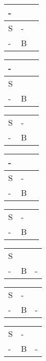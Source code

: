 \documentclass{article}
\newcommand{\wombat}{\cellcolor{newred}}
\newcommand{\pit}{\cellcolor{newblue}}
\newcommand{\wompit}{\cellcolor{newpurple}}
\begin{document}
	\begin{center}
		\begin{tabular}{|m{0.25cm}|m{0.25cm}|m{0.25cm}|}
			\hline
			- &&  \\ \hline
			S & - &\\ \hline
			- & B & \wompit \\ \hline
		\end{tabular}
		\quad
		\begin{tabular}{|m{0.25cm}|m{0.25cm}|m{0.25cm}|}
			\hline
			- &&  \\ \hline
			S & \wombat & \\ \hline
			- & B & \pit \\ \hline
		\end{tabular}
		\quad
		\begin{tabular}{|m{0.25cm}|m{0.25cm}|m{0.25cm}|}
			\hline
			\wombat &&  \\ \hline
			S & - & \\ \hline
			- & B & \pit \\ \hline
		\end{tabular}
		\quad
		\begin{tabular}{|m{0.25cm}|m{0.25cm}|m{0.25cm}|}
			\hline
			- &&  \\ \hline
			S & - & \\ \hline
			- & B & \pit \\ \hline
		\end{tabular}
	\end{center}

	\begin{center}
		\begin{tabular}{|m{0.25cm}|m{0.25cm}|m{0.25cm}|}
			\hline
			\pit &&  \\ \hline
			S & - &\\ \hline
			- & B & \wombat \\ \hline
		\end{tabular}
		\quad
		\begin{tabular}{|m{0.25cm}|m{0.25cm}|m{0.25cm}|}
			\hline
			\pit &&  \\ \hline
			S & \wombat & \\ \hline
			- & B & - \\ \hline
		\end{tabular}
		\quad
		\begin{tabular}{|m{0.25cm}|m{0.25cm}|m{0.25cm}|}
			\hline
			\wompit &&  \\ \hline
			S & - & \\ \hline
			- & B & - \\ \hline
		\end{tabular}
		\quad
		\begin{tabular}{|m{0.25cm}|m{0.25cm}|m{0.25cm}|}
			\hline
			\pit &&  \\ \hline
			S & - & \\ \hline
			- & B & - \\ \hline
		\end{tabular}
	\end{center}
\end{document}
